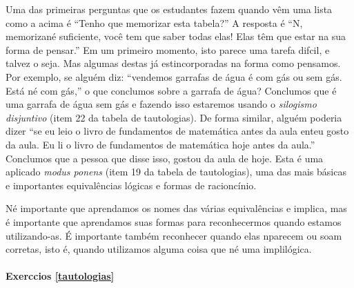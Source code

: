 Uma das primeiras perguntas que os estudantes fazem quando v\^em uma lista como a acima \'e ``Tenho que memorizar esta tabela?'' A resposta \'e ``N\aoi, memoriza\cao n\ao \'e suficiente, voc\^e tem que saber todas elas! Elas t\^em que estar na sua forma de pensar.'' Em um primeiro momento, isto parece uma tarefa dif\ih cil, e talvez o seja. Mas algumas destas j\'a est\ao incorporadas na forma como pensamos. Por exemplo, se algu\'em diz: ``vendemos  garrafas de \'agua \'e com g\'as ou sem g\'as. Está n\ao \'e com g\'as,'' o que conclu\ih mos sobre a garrafa de \'agua? Conclu\ih mos que \'e uma garrafa de \'agua sem g\'as e fazendo isso estaremos usando o \emph{silogismo disjuntivo} (item 22 da tabela de tautologias). De forma similar, algu\'em poderia dizer ``se eu leio o livro de fundamentos de matem\'atica antes da aula ent\ao eu gosto da aula. Eu li o livro de fundamentos de matem\'atica hoje antes da aula.'' Conclu\ih mos que a pessoa que disse isso, gostou da aula de hoje. Esta \'e uma aplica\cao do \emph{modus ponens} (item 19 da tabela de tautologias), uma das mais básicas e importantes equivalências lógicas e formas de racioncínio.

 N\ao \'e importante que aprendamos os nomes das v\'arias equival\^encias e implica\cois, mas \'e importante que aprendamos suas formas para reconhecermos quando estamos utilizando-as. \'E importante tamb\'em reconhecer quando elas n\ao parecem ou soam corretas, isto \'e, quando utilizamos alguma coisa que n\ao \'e uma impli\cao l\'ogica.



\paragraph{Exerc\ih cios \ref{tautologias}}

